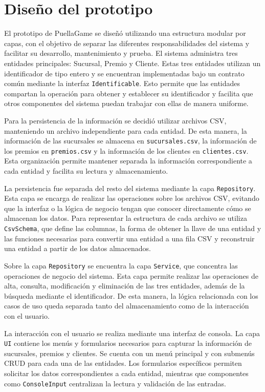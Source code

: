 \section{Diseño del prototipo}

El prototipo de PuellaGame se diseñó utilizando una estructura modular por capas, con el objetivo de separar las diferentes responsabilidades del sistema y facilitar su desarrollo, mantenimiento y prueba. El sistema administra tres entidades principales: Sucursal, Premio y Cliente. Estas tres entidades utilizan un identificador de tipo entero y se encuentran implementadas bajo un contrato común mediante la interfaz \texttt{Identificable}. Esto permite que las entidades compartan la operación para obtener y establecer su identificador y facilita que otros componentes del sistema puedan trabajar con ellas de manera uniforme.

Para la persistencia de la información se decidió utilizar archivos CSV, manteniendo un archivo independiente para cada entidad. De esta manera, la información de las sucursales se almacena en \texttt{sucursales.csv}, la información de los premios en \texttt{premios.csv} y la información de los clientes en \texttt{clientes.csv}. Esta organización permite mantener separada la información correspondiente a cada entidad y facilita su lectura y almacenamiento.

La persistencia fue separada del resto del sistema mediante la capa \texttt{Repository}. Esta capa se encarga de realizar las operaciones sobre los archivos CSV, evitando que la interfaz o la lógica de negocio tengan que conocer directamente cómo se almacenan los datos. Para representar la estructura de cada archivo se utiliza \texttt{CsvSchema}, que define las columnas, la forma de obtener la llave de una entidad y las funciones necesarias para convertir una entidad a una fila CSV y reconstruir una entidad a partir de los datos almacenados.

Sobre la capa \texttt{Repository} se encuentra la capa \texttt{Service}, que concentra las operaciones de negocio del sistema. Esta capa permite realizar las operaciones de alta, consulta, modificación y eliminación de las tres entidades, además de la búsqueda mediante el identificador. De esta manera, la lógica relacionada con los casos de uso queda separada tanto del almacenamiento como de la interacción con el usuario.

La interacción con el usuario se realiza mediante una interfaz de consola. La capa \texttt{UI} contiene los menús y formularios necesarios para capturar la información de sucursales, premios y clientes. Se cuenta con un menú principal y con submenús CRUD para cada una de las entidades. Los formularios específicos permiten solicitar los datos correspondientes a cada entidad, mientras que componentes como \texttt{ConsoleInput} centralizan la lectura y validación de las entradas.

